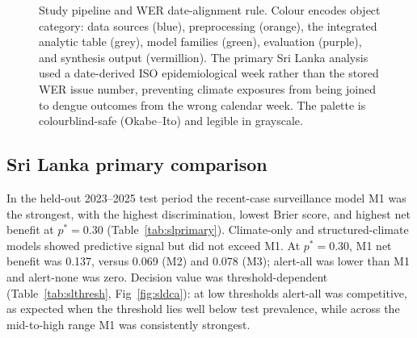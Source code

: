 \documentclass[11pt,a4paper]{article}
\begin{document}
\begin{figure}[htbp]
\caption{Study pipeline and WER date-alignment rule. Colour encodes object category: data sources (blue), preprocessing (orange), the integrated analytic table (grey), model families (green), evaluation (purple), and synthesis output (vermillion). The primary Sri Lanka analysis used a date-derived ISO epidemiological week rather than the stored WER issue number, preventing climate exposures from being joined to dengue outcomes from the wrong calendar week. The palette is colourblind-safe (Okabe--Ito) and legible in grayscale.}
\label{fig:pipeline}
\end{figure}

\subsection{Sri Lanka primary comparison}
In the held-out 2023--2025 test period the recent-case surveillance model M1 was the strongest, with the highest discrimination, lowest Brier score, and highest net benefit at $p^*=0.30$ (Table~\ref{tab:slprimary}). Climate-only and structured-climate models showed predictive signal but did not exceed M1. At $p^*=0.30$, M1 net benefit was 0.137, versus 0.069 (M2) and 0.078 (M3); alert-all was lower than M1 and alert-none was zero. Decision value was threshold-dependent (Table~\ref{tab:slthresh}, Fig~\ref{fig:sldca}): at low thresholds alert-all was competitive, as expected when the threshold lies well below test prevalence, while across the mid-to-high range M1 was consistently strongest.
\end{document}
